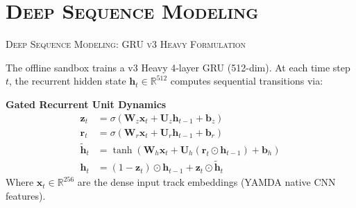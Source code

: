 \documentclass[xcolor=dvipsnames, aspectratio=1610]{beamer}
\begin{document}
\section{\textsc{Deep Sequence Modeling}}
\begin{frame}{\textsc{Deep Sequence Modeling: GRU v3 Heavy Formulation}}

  The offline sandbox trains a v3 Heavy 4-layer GRU (512-dim). At each time step $t$, the recurrent hidden state $\mathbf{h}_t \in \mathbb{R}^{512}$ computes sequential transitions via:

  \vspace{5mm}
  \begin{ExampleBox}
    \textbf{Gated Recurrent Unit Dynamics}
    \begin{align}
        \mathbf{z}_t &= \sigma(\mathbf{W}_z \mathbf{x}_t + \mathbf{U}_z \mathbf{h}_{t-1} + \mathbf{b}_z) \\
        \mathbf{r}_t &= \sigma(\mathbf{W}_r \mathbf{x}_t + \mathbf{U}_r \mathbf{h}_{t-1} + \mathbf{b}_r) \\
        \tilde{\mathbf{h}}_t &= \tanh(\mathbf{W}_h \mathbf{x}_t + \mathbf{U}_h (\mathbf{r}_t \odot \mathbf{h}_{t-1}) + \mathbf{b}_h) \\
        \mathbf{h}_t &= (1 - \mathbf{z}_t) \odot \mathbf{h}_{t-1} + \mathbf{z}_t \odot \tilde{\mathbf{h}}_t
    \end{align}
    Where $\mathbf{x}_t \in \mathbb{R}^{256}$ are the dense input track embeddings (YAMDA native CNN features).
  \end{ExampleBox}

\end{frame}
\end{document}
